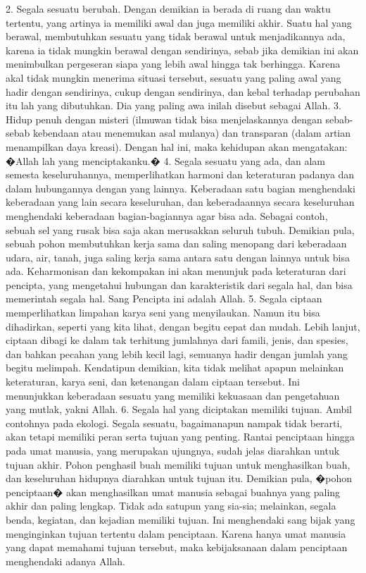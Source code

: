 \documentclass[]{article}
\begin{document}
2. Segala sesuatu berubah. Dengan demikian ia berada di ruang dan waktu tertentu, yang artinya ia memiliki awal dan juga memiliki akhir. Suatu hal yang berawal, membutuhkan sesuatu yang tidak berawal  untuk menjadikannya ada, karena ia tidak mungkin berawal dengan sendirinya, sebab jika demikian ini akan menimbulkan pergeseran siapa yang lebih awal hingga tak berhingga. Karena akal tidak mungkin menerima situasi tersebut, sesuatu yang paling awal yang hadir dengan sendirinya, cukup dengan sendirinya, dan kebal terhadap perubahan itu lah yang dibutuhkan.  Dia yang paling awa inilah disebut sebagai Allah.
3. Hidup penuh dengan misteri (ilmuwan tidak bisa menjelaskannya dengan sebab-sebab kebendaan atau menemukan asal mulanya) dan transparan (dalam artian menampilkan daya kreasi). Dengan hal ini, maka kehidupan akan mengatakan: �Allah lah yang menciptakanku.�
4. Segala sesuatu yang ada, dan alam semesta keseluruhannya, memperlihatkan harmoni dan keteraturan padanya dan dalam hubungannya dengan yang lainnya. Keberadaan satu bagian menghendaki keberadaan yang lain secara keseluruhan,  dan keberadaannya secara keseluruhan menghendaki keberadaan bagian-bagiannya agar bisa ada. Sebagai contoh, sebuah sel yang rusak bisa saja akan merusakkan seluruh tubuh. Demikian pula, sebuah pohon membutuhkan kerja sama dan saling menopang dari keberadaan udara, air, tanah, juga saling kerja sama antara satu dengan lainnya untuk bisa ada. Keharmonisan dan kekompakan ini akan menunjuk pada keteraturan dari pencipta, yang mengetahui hubungan dan karakteristik dari segala hal, dan bisa memerintah segala hal. Sang Pencipta ini adalah Allah.
5. Segala ciptaan memperlihatkan limpahan karya seni yang menyilaukan. Namun itu bisa dihadirkan, seperti yang kita lihat, dengan begitu cepat dan mudah. Lebih lanjut, ciptaan dibagi ke dalam tak terhitung jumlahnya dari famili, jenis, dan spesies, dan bahkan pecahan yang lebih kecil lagi, semuanya hadir dengan jumlah yang begitu melimpah. Kendatipun demikian, kita tidak melihat apapun melainkan keteraturan, karya seni, dan ketenangan dalam ciptaan tersebut. Ini menunjukkan keberadaan sesuatu yang memiliki kekuasaan dan pengetahuan yang mutlak, yakni Allah.
6. Segala hal yang diciptakan memiliki tujuan.  Ambil contohnya pada ekologi. Segala sesuatu, bagaimanapun nampak tidak berarti, akan tetapi memiliki peran serta tujuan yang penting. Rantai penciptaan hingga pada umat manusia, yang merupakan ujungnya, sudah jelas diarahkan untuk tujuan akhir. Pohon penghasil buah memiliki tujuan untuk menghasilkan buah, dan keseluruhan hidupnya diarahkan untuk tujuan itu. Demikian pula, �pohon penciptaan� akan menghasilkan umat manusia sebagai buahnya yang paling akhir dan paling lengkap. Tidak ada satupun yang sia-sia; melainkan, segala benda, kegiatan, dan kejadian memiliki tujuan. Ini menghendaki sang bijak yang menginginkan tujuan tertentu dalam penciptaan. Karena hanya umat manusia yang dapat memahami tujuan tersebut, maka kebijaksanaan dalam penciptaan menghendaki adanya  Allah.
\end{document}
